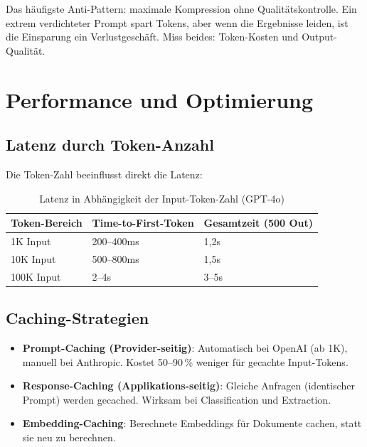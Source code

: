 \begin{praxishinweis}
Das häufigste Anti-Pattern: maximale Kompression ohne Qualitätskontrolle. Ein extrem verdichteter Prompt spart Tokens, aber wenn die Ergebnisse leiden, ist die Einsparung ein Verlustgeschäft. Miss beides: Token-Kosten und Output-Qualität.
\end{praxishinweis}

\section{Performance und Optimierung}

\subsection{Latenz durch Token-Anzahl}

Die Token-Zahl beeinflusst direkt die Latenz:

\begin{table}[H]
\centering
\begin{tabularx}{\linewidth}{lXX}
\toprule
\textbf{Token-Bereich} & \textbf{Time-to-First-Token} & \textbf{Gesamtzeit (500 Out)} \\
\midrule
1K Input & 200--400ms & 1,2s \\
10K Input & 500--800ms & 1,5s \\
100K Input & 2--4s & 3--5s \\
\midrule
\end{tabularx}
\caption{Latenz in Abhängigkeit der Input-Token-Zahl (GPT-4o)}
\label{tab:latenz-tokens}
\end{table}

\subsection{Caching-Strategien}

\begin{itemize}[leftmargin=*]
    \item \textbf{Prompt-Caching (Provider-seitig)}: Automatisch bei OpenAI (ab 1K), manuell bei Anthropic. Kostet 50--90\,\% weniger für gecachte Input-Tokens.
    \item \textbf{Response-Caching (Applikations-seitig)}: Gleiche Anfragen (identischer Prompt) werden gecached. Wirksam bei Classification und Extraction.
    \item \textbf{Embedding-Caching}: Berechnete Embeddings für Dokumente cachen, statt sie neu zu berechnen.
\end{itemize}

